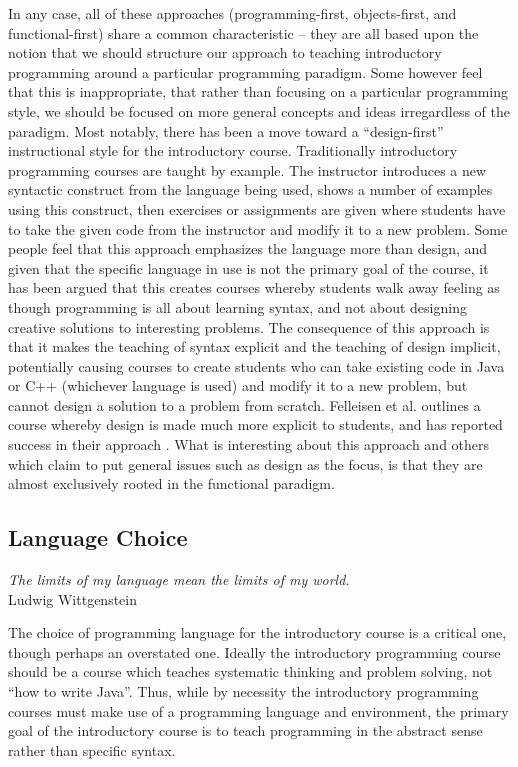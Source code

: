 In any case, all of these approaches (programming-first, objects-first, and functional-first) share a common characteristic -- they are all based upon the notion that we should structure our approach to teaching introductory programming around a particular programming paradigm.  Some however feel that this is inappropriate, that rather than focusing on a particular programming style, we should be focused on more general concepts and ideas irregardless of the paradigm.   Most notably, there has been a move toward a ``design-first'' instructional style for the introductory course.  Traditionally introductory programming courses are taught by example.  The instructor introduces a new syntactic construct from the language being used, shows a number of examples using this construct, then exercises or assignments are given where students have to take the given code from the instructor and modify it to a new problem.  Some people feel that this approach emphasizes the language more than design, and given that the specific language in use is not the primary goal of the course, it has been argued that this creates courses whereby students walk away feeling as though programming is all about learning syntax, and not about designing creative solutions to interesting problems.  The consequence of this approach is that it makes the teaching of syntax explicit and the teaching of design implicit, potentially causing courses to create students who can take existing code in Java or C++ (whichever language is used) and modify it to a new problem, but cannot design a solution to a problem from scratch.  Felleisen et al. outlines a course whereby design is made much more explicit to students, and has reported success in their approach \cite{Flatt04}.  What is interesting about this approach and others which claim to put general issues such as design as the focus, is that they are almost exclusively rooted in the functional paradigm.

\subsection{Language Choice}

\begin{flushright}
\textit{The limits of my language mean the limits of my world.}
\\
Ludwig Wittgenstein \cite{Wittgenstein22} \\
\end{flushright}

The choice of programming language for the introductory course is a critical one, though perhaps an overstated one.  Ideally the introductory programming course should be a course which teaches systematic thinking and problem solving, not ``how to write Java''.  Thus, while by necessity the introductory programming courses must make use of a programming language and environment, the primary goal of the introductory course is to teach programming in the abstract sense rather than specific syntax.

